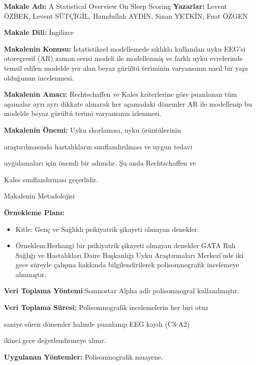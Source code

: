 \documentclass {beamer}
\begin{document}
 \begin{frame}
 \textbf{Makale Adı:} A Statistical Overview On Sleep Scoring
 \textbf{Yazarlar:} Levent ÖZBEK, Levent SÜTÇİGİL, Hamdullah AYDIN, Sinan YETKİN, Fuat ÖZGEN
 
 \textbf{Makale Dili:} İngilizce
 
 \textbf{Makalenin Konusu:} İstatistiksel modellemede sıklıkla kullanılan uyku EEG'si otoregresif (AR) zaman serisi modeli ile modellenmiş ve farklı uyku evrelerinde temsil edilen modelde yer alan beyaz gürültü teriminin varyansının nasıl bir yapı olduğunun incelenmesi.


 
 \textbf{Makalenin Amacı:} Rechtschaffen ve Kales kriterlerine göre puanlanan tüm aşamalar ayrı ayrı dikkate alınarak her aşamadaki dönemler AR ile modellenip bu modelde beyaz gürültü terimi varyansının izlenmesi.
 
\textbf{Makalenin Önemi:} Uyku skorlaması, uyku örüntülerinin 


araştırılmasında hastalıkların sınıflandırılması ve uygun tedavi 


uygulamaları için önemli bir adımdır. Şu anda Rechtschaffen ve 

Kales sınıflandırması geçerlidir.

    
 \end{frame}


\begin{frame}{Makalenin Metadolojisi}

\textbf{Örnekleme Planı:}
\begin{itemize}
    \item Kitle: Genç ve Sağlıklı psikiyatrik şikayeti olmayan denekler.

    \item Örneklem:Herhangi bir psikiyatrik şikayeti olmayan denekler GATA Ruh Sağlığı ve Hastalıkları Daire Başkanlığı Uyku Araştırmaları Merkezi'nde iki gece süreyle çalışma hakkında bilgilendirilerek polisomnografik incelemeye alınmıştır.
\end{itemize}

\textbf{Veri Toplama Yöntemi}:Somnostar Alpha adlı polisomnograf kullanılmıştır.

\textbf{Veri Toplama Süresi:} Polisomnografik incelemelerin her biri otuz 

saniye süren dönemler halinde puanlanıp EEG kaydı (C3-A2) 

ikinci gece değerlendirmeye alınır.

\textbf{Uygulanan Yöntemler:} Polisomnografik muayene.
\end{frame}
 
\end{document}
